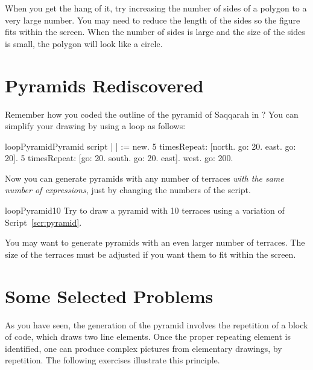 \newcommand{\replace}[2]{If}{When} you get the hang of it, try \newcommand{\replace}[2]{to augment}{increasing} the number of sides of a
polygon to a very large number. You may need to reduce the \newcommand{\replace}[2]{size}{length} of
the sides so \newcommand{\replace}[2]{that}{the} figure fits within the screen. When the
number of sides is large and the size of the sides is small, the
polygon will look like a circle.


\section{Pyramids Rediscovered}\label{sec:bouclonpyramids}
Remember how you coded the outline of the pyramid of Saqqarah in
? You can simplify your drawing by using a loop 
as follows:

\begin{scriptfig}{loopPyramid}{Pyramid script} \label{scr:pyramid}
| \caro |
\caro := \Turtle new.
5 timesRepeat: 
     [\caro north.
     \caro go: 20.
     \caro east.
     \caro go: 20].
5 timesRepeat: 
     [\caro go: 20.
     \caro south.
     \caro go: 20.
     \caro east].
\caro west.
\caro go: 200.
\end{scriptfig}

Now you \newcommand{\replace}[2]{should be able to}{can} generate pyramids with any number of
terraces \emph{with the same number of expressions}, just by changing
the numbers of the script.

\begin{exofig}{loopPyramid10} \label{exo:pyramid}
Try to draw a pyramid with 10 terraces using a variation of Script~\ref{scr:pyramid}.
\end{exofig}

You may want to generate pyramids with an even larger number of
terraces. The size of the terraces must be adjusted if you want
them to fit within the screen.

\section{Some Selected Problems}
As you have seen, the generation of the pyramid involves the
repetition of a block of code, which draws two line elements. Once the
proper repeating element is identified, one can produce complex
\newcommand{\replace}[2]{picture}{pictures} from elementary \newcommand{\replace}[2]{drawing}{drawings}, by \newcommand{\replace}[2]{repeating themselves}{repetition}.  The
following exercises illustrate this principle.

